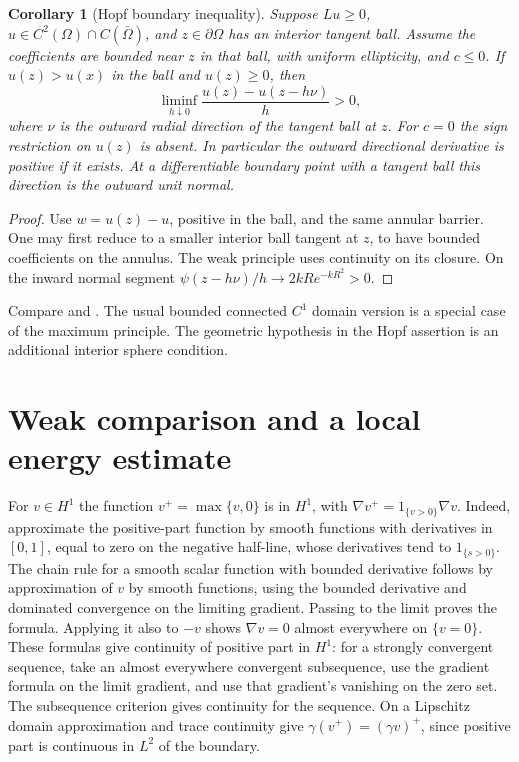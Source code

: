 \documentclass[11pt,oneside,openany]{book}
\theoremstyle{plain}
\newtheorem{corollary}[theorem]{Corollary}
\theoremstyle{definition}
\theoremstyle{remark}
\begin{document}
\begin{corollary}[Hopf boundary inequality]\label{pde:elliptic-hopf}
Suppose \(Lu\geq0\), \(u\in C^2(\Omega)\cap C(\bar\Omega)\),
and \(z\in\partial\Omega\) has an interior tangent ball. Assume the
coefficients are bounded near \(z\) in that ball, with uniform
ellipticity, and \(c\leq0\). If \(u(z)>u(x)\) in the ball and
\(u(z)\geq0\), then
\[
 \liminf_{h\downarrow0}\frac{u(z)-u(z-h\nu)}{h}>0,
\]
where \(\nu\) is the outward radial direction of the tangent ball
at \(z\). For \(c=0\) the sign restriction on \(u(z)\) is absent.
In particular the outward directional derivative is positive if
it exists. At a differentiable boundary point with a tangent ball
this direction is the outward unit normal.
\end{corollary}

\begin{proof}
Use \(w=u(z)-u\), positive in the ball, and the same annular
barrier. One may first reduce to a smaller interior ball tangent
at \(z\), to have bounded coefficients on the annulus. The weak
principle uses continuity on its closure. On the inward normal
segment \(\psi(z-h\nu)/h\to2kR e^{-kR^2}>0\).
\end{proof}

Compare \cite[Sections 3.1--3.2]{GT} and
\cite[Sections 4.1.1--4.1.2]{RR}. The usual bounded connected
\(C^1\) domain version is a special case of the maximum principle.
The geometric hypothesis in the Hopf assertion is an additional
interior sphere condition.

\section{Weak comparison and a local energy estimate}\label{pde:E04}

For \(v\in H^1\) the function \(v^+=\max\{v,0\}\) is in \(H^1\),
with \(\nabla v^+=1_{\{v>0\}}\nabla v\).
Indeed, approximate the positive-part function by smooth
functions with derivatives in \([0,1]\), equal to zero on the
negative half-line, whose derivatives tend to \(1_{\{s>0\}}\).
The chain rule for a smooth scalar function with bounded derivative
follows by approximation of \(v\) by smooth functions, using the
bounded derivative and dominated convergence on the limiting
gradient. Passing to the limit proves the formula. Applying it
also to \(-v\) shows \(\nabla v=0\) almost everywhere on \(\{v=0\}\).
These formulas give continuity of positive part in \(H^1\):
for a strongly convergent sequence, take an almost everywhere
convergent subsequence, use the gradient formula on the limit
gradient, and use that gradient's vanishing on the zero set.
The subsequence criterion gives continuity for the sequence.
On a Lipschitz domain approximation and trace continuity give
\(\gamma(v^+)=(\gamma v)^+\), since positive part is continuous
in \(L^2\) of the boundary.
\end{document}
